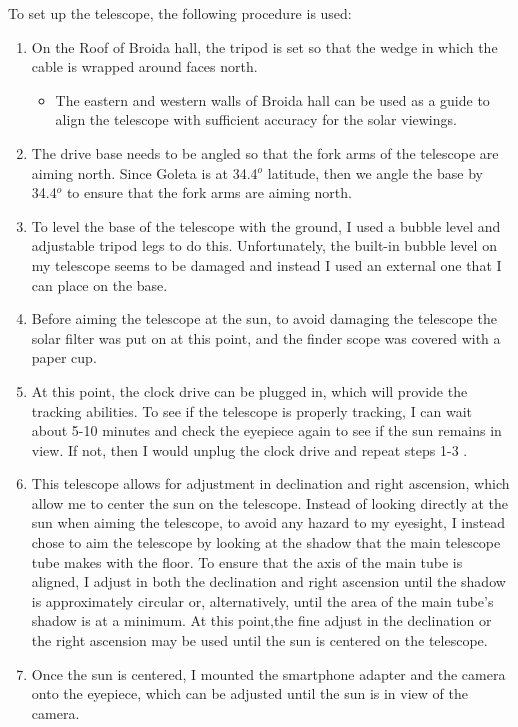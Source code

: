 \documentclass[aps,twocolumn,showpacs,preprintnumbers]{revtex4}
\begin{document}
To set up the telescope, the following procedure is used:
\begin{enumerate}
  \item  On the Roof of Broida hall, the tripod is set so that the wedge in which the cable is wrapped around faces north.
  \begin{itemize}
      \item The eastern and western walls of Broida hall can be used as a guide to align the telescope with sufficient accuracy for the solar viewings.
  \end{itemize}
  \item The drive base needs to be angled so that the fork arms of the telescope are aiming north. Since Goleta is at 34.4$^o$ latitude, then we angle the base by 34.4$^o$ to ensure that the fork arms are aiming north. 
  \item  To level the base of the telescope with the ground, I used a bubble level and adjustable tripod legs to do this. Unfortunately, the built-in bubble level on my telescope seems to be damaged and instead I used an external one that I can place on the base.
  \item Before aiming the telescope at the sun, to avoid damaging the telescope the solar filter was put on at this point, and the finder scope was covered with a paper cup.
  \item At this point, the clock drive can be plugged in, which will provide the tracking abilities. To see if the telescope is properly tracking, I can wait about 5-10 minutes and check the eyepiece again to see if the sun remains in view. If not, then I would unplug the clock drive and repeat steps 1-3 \cite{comment 1}. 
  \item This telescope allows for adjustment in declination and right ascension, which allow me to center the sun on the telescope. Instead of looking directly at the sun when aiming the telescope, to avoid any hazard to my eyesight, I instead chose to aim the telescope by looking at the shadow that the main telescope tube makes with the floor. To ensure that the axis of the main tube is aligned, I adjust in both the declination and right ascension until the shadow is approximately circular or, alternatively, until the area of the main tube's shadow is at a minimum. At this point,the fine adjust in the declination or the right ascension may be used until the sun is centered on the telescope.
  \item Once the sun is centered, I mounted the smartphone adapter and the camera onto the eyepiece, which can be adjusted until the sun is in view of the camera.
\end{enumerate}
\end{document}
